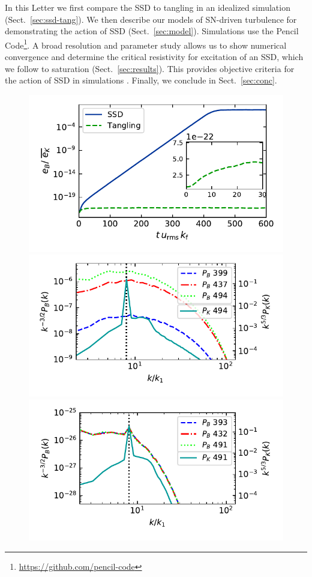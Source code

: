 \documentclass[preprint2]{aastex63}
\begin{document}
 In this {L}etter we {first} compare the SSD to tangling in an idealized
 simulation (Sect.~\ref{sec:ssd-tang}){.
 We then describe our models of SN-driven turbulence for demonstrating the
 action of SSD (Sect.~\ref{sec:model}).} 
 {Simulations} use the {\sc Pencil Code}\footnote{
 \href{https://github.com/pencil-code}{https://github.com/pencil-code}}.
 A broad resolution and parameter study allows us to {show numerical}
 {convergence and} {determine} the critical resistivity for excitation
 of an SSD, {which we follow} to saturation (Sect.~\ref{sec:results}).
 This provides objective criteria {for the action} of SSD in simulations
 \citep[such as][]{Gent:2013b,GE20,SBADMN19}.
 Finally, we conclude in Sect.~\ref{sec:conc}.
\begin{figure}
  \includegraphics[trim=0.00cm 0.3cm 0.0cm 0.0cm, clip=true,width=0.91\columnwidth]{figs/ssd-tang-brms.pdf}
  \includegraphics[trim=0.25cm 0.3cm 0.5cm 0.1cm, clip=true,width=1.0\columnwidth]{figs/ssdBpower.pdf}
  \includegraphics[trim=0.35cm 0.6cm 0.5cm 0.3cm, clip=true,width=1.0\columnwidth]{figs/tanglingBpower.pdf}

\end{figure}
\end{document}
